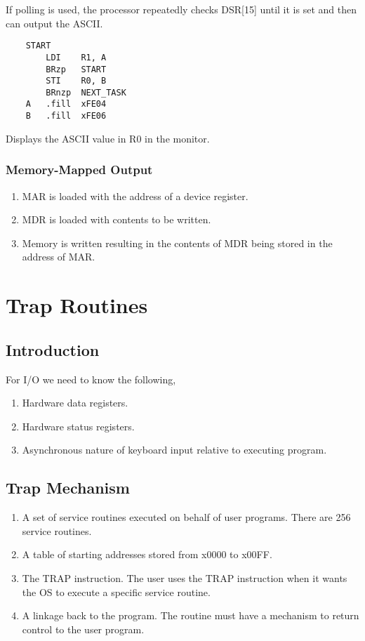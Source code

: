 If polling is used, the processor repeatedly checks DSR[15] until it is set and then can output the ASCII.

\begin{verbatim}
    START
        LDI    R1, A
        BRzp   START
        STI    R0, B
        BRnzp  NEXT_TASK
    A   .fill  xFE04
    B   .fill  xFE06
\end{verbatim}

Displays the ASCII value in R0 in the monitor.

\subsubsection{Memory-Mapped Output}
\begin{enumerate}
    \item MAR is loaded with the address of a device register.
    \item MDR is loaded with contents to be written.
    \item Memory is written resulting in the contents of MDR being stored in the address of MAR.
\end{enumerate}


\section{Trap Routines}
\subsection{Introduction}
For I/O we need to know the following, 
\begin{enumerate}
    \item Hardware data registers.
    \item Hardware status registers.
    \item Asynchronous nature of keyboard input relative to executing program.
\end{enumerate}


\subsection{Trap Mechanism}
\begin{enumerate}
    \item A set of service routines executed  on behalf of user programs. There are 256 service routines.
    \item A table of starting addresses stored from x0000 to x00FF.
    \item The TRAP instruction. The user uses the TRAP instruction when it wants the OS to execute a specific service routine.
    \item A linkage back to the program. The routine must have a mechanism to return control to the user program.
\end{enumerate}

